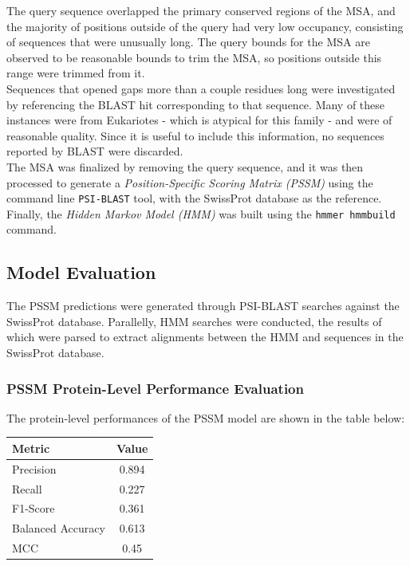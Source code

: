 \documentclass[10pt,twocolumn,letterpaper]{article}
\begin{document}
The query sequence overlapped the primary conserved regions of the MSA, and the majority of positions outside of the query had very low occupancy, consisting of sequences that were unusually long. The query bounds for the MSA are observed to be reasonable bounds to trim the MSA, so positions outside this range were trimmed from it. \\

Sequences that opened gaps more than a couple residues long were investigated by referencing the BLAST hit corresponding to that sequence. Many of these instances were from Eukariotes - which is atypical for this family - and were of reasonable quality. Since it is useful to include this information, no sequences reported by BLAST were discarded. \\

The MSA was finalized by removing the query sequence, and it was then processed to generate a \textit{Position-Specific Scoring Matrix (PSSM)} using the command line \texttt{PSI-BLAST} tool, with the SwissProt database as the reference. Finally, the \textit{Hidden Markov Model (HMM)} was built using the \texttt{hmmer hmmbuild} command.

\subsection{Model Evaluation}

The PSSM predictions were generated through PSI-BLAST searches against the SwissProt database.
Parallelly, HMM searches were conducted, the results of which were parsed to extract alignments between the HMM and sequences in the SwissProt database.

\subsubsection{PSSM Protein-Level Performance Evaluation}

The protein-level performances of the PSSM model are shown in the table below:

\begin{center}
    \begin{tabular}{lc}
        \toprule
        Metric & Value \\
        \midrule
        Precision & 0.894 \\
        Recall & 0.227 \\
        F1-Score & 0.361 \\
        Balanced Accuracy & 0.613 \\
        MCC & 0.45 \\
        \bottomrule
    \end{tabular}
\end{center} \\ 
\end{document}
